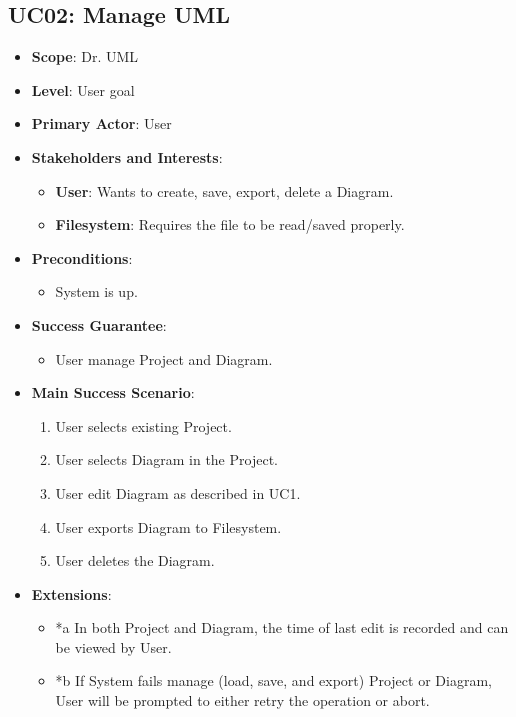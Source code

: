 \documentclass[12pt]{article}
\begin{document}
    \subsection{UC02: Manage UML}
    \begin{itemize}
        \item \textbf{Scope}: Dr. UML
        \item \textbf{Level}: User goal
        \item \textbf{Primary Actor}: User
        \item \textbf{Stakeholders and Interests}:
        \begin{itemize}
            \item \textbf{User}: Wants to create, save, export, delete a Diagram.
            \item \textbf{Filesystem}: Requires the file to be read/saved properly.
        \end{itemize}
        \item \textbf{Preconditions}:
        \begin{itemize}
            \item System is up.
        \end{itemize}
        \item \textbf{Success Guarantee}:
        \begin{itemize}
            \item User manage Project and Diagram.
        \end{itemize}
        \item \textbf{Main Success Scenario}:
        \begin{enumerate}
            \item User selects existing Project.
            \item User selects Diagram in the Project.
            \item User edit Diagram as described in UC1.
            \item User exports Diagram to Filesystem.
            \item User deletes the Diagram.
        \end{enumerate}
        \item \textbf{Extensions}:
        \begin{itemize}
            \item *a In both Project and Diagram, the time of last edit is recorded and can be viewed by User.
            \item *b If System fails manage (load, save, and export) Project or Diagram, User will be prompted to either retry the operation or abort.

\end{itemize}
\end{itemize}
\end{document}
